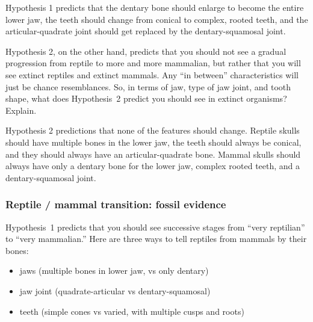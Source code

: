 \documentclass[12pt, hidelinks]{exam}
\newcommand*\AnswerBox[2]{%
    \parbox[t][#1]{0.92\textwidth}{%
    \begin{solution}#2\end{solution}}
    \vspace{\stretch{1}}
}
\begin{document}
\begin{questions}
\AnswerBox{6\baselineskip}{%
Hypothesis 1 predicts that the dentary bone should enlarge to become the entire lower jaw, the teeth should change from conical to complex, rooted teeth, and the articular-quadrate joint should get replaced by the dentary-squamosal joint.
}


\question
Hypothesis 2, on the other hand, predicts that you should not see a gradual progression from reptile to more and more mammalian, but rather that you will see extinct reptiles and extinct mammals.  Any ``in between'' characteristics will just be chance resemblances.  So, in terms of jaw, type of jaw joint, and tooth shape, what does Hypothesis~2 predict you should see in extinct organisms?  Explain.

\AnswerBox{6\baselineskip}{%
Hypothesis 2 predictions that none of the features should change. Reptile skulls should have multiple bones in the lower jaw, the teeth should always be conical, and they should always have an articular-quadrate bone. Mammal skulls should always have only a dentary bone for the lower jaw, complex rooted teeth, and a dentary-squamosal joint.}

\newpage

\subsubsection*{Reptile / mammal transition: fossil evidence}

Hypothesis~1 predicts that you should see successive stages from ``very reptilian'' to
``very mammalian.'' Here are three ways to tell reptiles from mammals by their bones:



\begin{itemize}
\item
  jaws (multiple bones in lower jaw, vs only dentary)
\item
  jaw joint (quadrate-articular vs dentary-squamosal)
\item
  teeth (simple cones vs varied, with multiple cusps and roots)
\end{itemize}


\end{questions}
\end{document}
